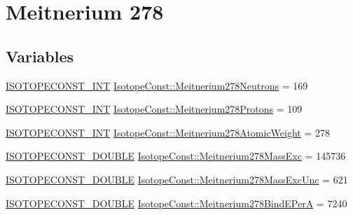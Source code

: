 \hypertarget{group___isotope_const-_meitnerium-_mt278}{}\section{Meitnerium 278}
\label{group___isotope_const-_meitnerium-_mt278}
\subsection*{Variables}
\begin{DoxyCompactItemize}
\item 
\mbox{\hyperlink{group___isotope_const-_macros_ga5f18360b3e99483a35c32d789e62621c}{I\+S\+O\+T\+O\+P\+E\+C\+O\+N\+S\+T\+\_\+\+I\+NT}} \mbox{\hyperlink{group___isotope_const-_meitnerium-_mt278_gac936e0a593ee166b5cae1bddac62ed61}{Isotope\+Const\+::\+Meitnerium278\+Neutrons}} = 169
\item 
\mbox{\hyperlink{group___isotope_const-_macros_ga5f18360b3e99483a35c32d789e62621c}{I\+S\+O\+T\+O\+P\+E\+C\+O\+N\+S\+T\+\_\+\+I\+NT}} \mbox{\hyperlink{group___isotope_const-_meitnerium-_mt278_gab908dd47e66181d7f85729cc789b4202}{Isotope\+Const\+::\+Meitnerium278\+Protons}} = 109
\item 
\mbox{\hyperlink{group___isotope_const-_macros_ga5f18360b3e99483a35c32d789e62621c}{I\+S\+O\+T\+O\+P\+E\+C\+O\+N\+S\+T\+\_\+\+I\+NT}} \mbox{\hyperlink{group___isotope_const-_meitnerium-_mt278_gae37ec4145ef14b6697bcd876a8faa621}{Isotope\+Const\+::\+Meitnerium278\+Atomic\+Weight}} = 278
\item 
\mbox{\hyperlink{group___isotope_const-_macros_ga8f45a7272ce02c0b4c65c44636ed719a}{I\+S\+O\+T\+O\+P\+E\+C\+O\+N\+S\+T\+\_\+\+D\+O\+U\+B\+LE}} \mbox{\hyperlink{group___isotope_const-_meitnerium-_mt278_gabe6e28af72edc602a445f216c1bf8fee}{Isotope\+Const\+::\+Meitnerium278\+Mass\+Exc}} = 145736
\item 
\mbox{\hyperlink{group___isotope_const-_macros_ga8f45a7272ce02c0b4c65c44636ed719a}{I\+S\+O\+T\+O\+P\+E\+C\+O\+N\+S\+T\+\_\+\+D\+O\+U\+B\+LE}} \mbox{\hyperlink{group___isotope_const-_meitnerium-_mt278_ga22f2cddc0255cb0e1d0ef49fae5306ea}{Isotope\+Const\+::\+Meitnerium278\+Mass\+Exc\+Unc}} = 621
\item 
\mbox{\hyperlink{group___isotope_const-_macros_ga8f45a7272ce02c0b4c65c44636ed719a}{I\+S\+O\+T\+O\+P\+E\+C\+O\+N\+S\+T\+\_\+\+D\+O\+U\+B\+LE}} \mbox{\hyperlink{group___isotope_const-_meitnerium-_mt278_ga9518bb448912e007a9fb2767e21d4a94}{Isotope\+Const\+::\+Meitnerium278\+Bind\+E\+PerA}} = 7240
\item 

\end{DoxyCompactItemize}
